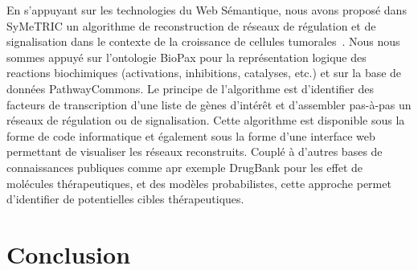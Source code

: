 \documentclass[a4paper,10pt]{article}
\theoremstyle{definition}
\begin{document}
En s'appuyant sur les technologies du Web Sémantique, nous avons proposé dans SyMeTRIC un algorithme de reconstruction de réseaux de régulation et de signalisation dans le contexte de la croissance de cellules tumorales~\cite{jobim17}. Nous nous sommes appuyé sur l'ontologie BioPax pour la représentation logique des reactions biochimiques (activations, inhibitions, catalyses, etc.) et sur la base de données PathwayCommons. Le principe de l'algorithme est d'identifier des facteurs de transcription d'une liste de gènes d'intérêt et d'assembler pas-à-pas un réseaux de régulation ou de signalisation. Cette algorithme est disponible sous la forme de code informatique et également sous la forme d'une interface web permettant de visualiser les réseaux reconstruits. Couplé à d'autres bases de connaissances publiques comme apr exemple DrugBank pour les effet de molécules thérapeutiques, et des modèles probabilistes, cette approche permet d'identifier de potentielles cibles thérapeutiques. 

\section{Conclusion}


\end{document}
